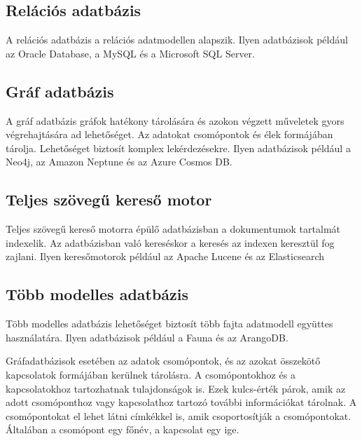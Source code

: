 \subsection{Relációs adatbázis}
A relációs adatbázis a relációs adatmodellen alapszik. Ilyen adatbázisok például az Oracle Database, a MySQL és a Microsoft SQL Server.

\subsection{Gráf adatbázis}
A gráf adatbázis gráfok hatékony tárolására és azokon végzett műveletek gyors végrehajtására ad lehetőséget. Az adatokat csomópontok és élek formájában tárolja. Lehetőséget biztosít komplex lekérdezésekre. Ilyen adatbázisok például a Neo4j, az Amazon Neptune és az Azure Cosmos DB.

\subsection{Teljes szövegű kereső motor}
Teljes szövegű kereső motorra épülő adatbázisban a dokumentumok tartalmát indexelik. Az adatbázisban való kereséskor a keresés az indexen keresztül fog zajlani. Ilyen keresőmotorok például az Apache Lucene és az Elasticsearch

\subsection{Több modelles adatbázis}
Több modelles adatbázis lehetőséget biztosít több fajta adatmodell együttes használatára. Ilyen adatbázisok például a Fauna és az ArangoDB.


Gráfadatbázisok esetében az adatok csomópontok, és az azokat összekötő kapcsolatok formájában kerülnek tárolásra. \cite{adatok-leirasa} A csomópontokhoz és a kapcsolatokhoz tartozhatnak tulajdonságok is. Ezek kulcs-érték párok, amik az adott csomóponthoz vagy kapcsolathoz tartozó további információkat tárolnak. A csomópontokat el lehet látni címkékkel is, amik csoportosítják a csomópontokat. Általában a csomópont egy főnév, a kapcsolat egy ige.

